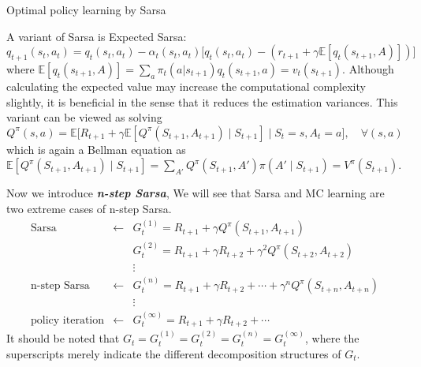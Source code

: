 \documentclass[10pt]{elegantbook}
\newcommand{\mydefination}[1]{\textbf{\textit{\textcolor{structurecolor}{#1}}}}
\begin{document}
\begin{algorithm}[H]
\caption{Optimal policy learning by Sarsa}
\KwIn{Initial policy $\pi_0(a|s)$, $Q_0(s,a)$, $\forall (s,a), \epsilon \in (0, 1]$}

\end{algorithm}

A variant of Sarsa is Expected Sarsa:
\[
    q_{t+1}(s_t, a_t) = q_t(s_t, a_t) - \alpha_t(s_t, a_t) \big [ q_t(s_t, a_t) - (r_{t+1} + \gamma \mathbb E [ q_t(s_{t+1}, A) ] ) \big ]
\]
where $\mathbb E [ q_t(s_{t+1}, A) ] = \sum_a \pi_t(a | s_{t+1}) q_t(s_{t+1}, a) = v_t(s_{t+1})$. Although calculating the
expected value may increase the computational complexity slightly, it is beneficial
in the sense that it reduces the estimation variances. This variant can be viewed as solving
\[
    Q^{\pi}(s, a) = \mathbb E \big [ R_{t+1} + \gamma \mathbb E [ Q^{\pi}(S_{t+1}, A_{t+1}) \mid S_{t+1} ] \mid S_t = s, A_t = a \big ], \quad \forall (s, a)
\]
which is again a Bellman equation as $\mathbb E [ Q^{\pi}(S_{t+1}, A_{t+1}) \mid S_{t+1} ] = \sum_{A'} Q^{\pi}(S_{t+1}, A') \pi(A' \mid S_{t+1}) = V^{\pi}(S_{t+1})$.

Now we introduce \mydefination{n-step Sarsa}, We will see that Sarsa and MC learning are two extreme cases of n-step Sarsa.
\[
\begin{array}{rll}
    \text{Sarsa} & \leftarrow & G^{(1)}_{t} = R_{t+1} + \gamma Q^{\pi}(S_{t+1}, A_{t+1}) \\
    && G^{(2)}_{t} = R_{t+1} + \gamma R_{t+2} + \gamma^2 Q^{\pi}(S_{t+2}, A_{t+2}) \\
    && \vdots \\
    \text{n-step Sarsa} & \leftarrow & G^{(n)}_{t} = R_{t+1} + \gamma R_{t+2} + \cdots + \gamma^n Q^{\pi}(S_{t+n}, A_{t+n}) \\
    && \vdots \\
    \text{policy iteration} & \leftarrow & G^{(\infty)}_{t} = R_{t+1} + \gamma R_{t+2} + \cdots
\end{array}
\]
It should be noted that $G_t = G^{(1)}_{t} = G^{(2)}_{t} = G^{(n)}_{t} = G^{(\infty)}_{t}$, where the superscripts merely
indicate the different decomposition structures of $G_t$. 
\end{document}
